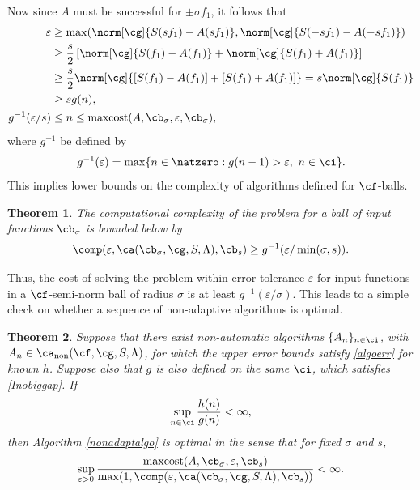 \documentclass[]{elsarticle}
\DeclareMathOperator{\fix}{non}
\DeclareMathOperator{\maxcost}{maxcost}
\newtheorem{theorem}{Theorem}
\theoremstyle{definition}
\theoremstyle{remark}
\begin{document}
Now since $A$ must be successful for $\pm \sigma f_1$, it follows that 
\begin{align*}
\varepsilon & \ge \max(\norm[\cg]{S(sf_1)-A(sf_1)},\norm[\cg]{S(-sf_1)-A(-sf_1)}) \\
& \ge \frac{s}{2} \left[ \norm[\cg]{S(f_1)-A(f_1)}+ \norm[\cg]{S(f_1)+A(f_1)} \right] \\
& \ge \frac{s}{2} \norm[\cg]{[S(f_1)-A(f_1)]+[S(f_1)+A(f_1)]} = s\norm[\cg]{S(f_1)}  \\
& \ge s g(n),\\
g^{-1}(\varepsilon/s) & \le n \le \maxcost(A,\cb_{\sigma},\varepsilon,\cb_{\sigma}),
\end{align*}
where $g^{-1}$ be defined by
\begin{equation} \label{ginvdef}
g^{-1}(\varepsilon) = \max \{ n \in \natzero : g(n-1) > \varepsilon, \ n \in \ci \}.
\end{equation}
This implies lower bounds on the complexity of algorithms defined for $\cf$-balls.

\begin{theorem} \label{complowbdball} The computational complexity of the problem for a ball of input functions $\cb_{\sigma}$ is bounded below by
\begin{equation*}
\comp(\varepsilon,\ca(\cb_{\sigma},\cg,S,\Lambda),\cb_s) \ge
g ^{-1}(\varepsilon/\min(\sigma,s)).
\end{equation*}
\end{theorem}
Thus, the cost of solving the problem within error tolerance $\varepsilon$ for input functions in a $\cf$-semi-norm ball of radius $\sigma$ is at least $g^{-1}(\varepsilon/\sigma)$.  This leads to a simple check on whether a sequence of non-adaptive algorithms is optimal.

\begin{theorem} \label{optimalprop} Suppose that there exist non-automatic algorithms $\{A_n\}_{n \in \ci}$, with $A_n  \in \ca_{\fix}(\cf,\cg,S,\Lambda)$, for which the upper error bounds satisfy \eqref{algoerr} for known $h$.  Suppose also that $g$ is also defined on the same $\ci$, which satisfies \eqref{Inobiggap}. If 
\begin{equation}\label{ghcond}
\sup_{n \in \ci} \frac{h(n)}{g(n)} < \infty,
\end{equation}
then Algorithm \ref{nonadaptalgo} is optimal in the sense that for fixed $\sigma$ and $s$, 
\[
\sup_{\varepsilon > 0} \frac{\maxcost(A,\cb_{\sigma},\varepsilon,\cb_{s})}
{\max(1,\comp(\varepsilon,\ca(\cb_{\sigma},\cg,S,\Lambda),\cb_s))} <\infty.
\]
\end{theorem}
\end{document}
